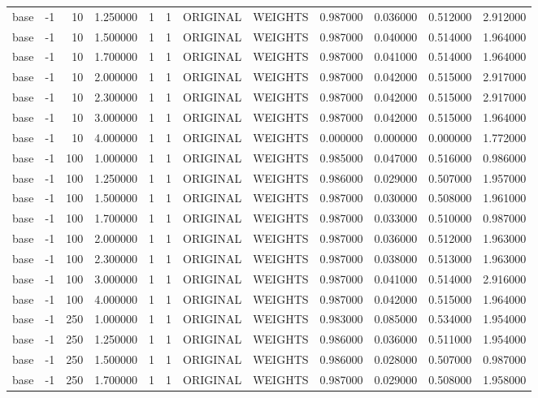 \begin{tabular}{lrrrllllrrrr}
base & -1 & 10 & 1.250000 & 1 & 1 & ORIGINAL & WEIGHTS & 0.987000 & 0.036000 & 0.512000 & 2.912000 \\
base & -1 & 10 & 1.500000 & 1 & 1 & ORIGINAL & WEIGHTS & 0.987000 & 0.040000 & 0.514000 & 1.964000 \\
base & -1 & 10 & 1.700000 & 1 & 1 & ORIGINAL & WEIGHTS & 0.987000 & 0.041000 & 0.514000 & 1.964000 \\
base & -1 & 10 & 2.000000 & 1 & 1 & ORIGINAL & WEIGHTS & 0.987000 & 0.042000 & 0.515000 & 2.917000 \\
base & -1 & 10 & 2.300000 & 1 & 1 & ORIGINAL & WEIGHTS & 0.987000 & 0.042000 & 0.515000 & 2.917000 \\
base & -1 & 10 & 3.000000 & 1 & 1 & ORIGINAL & WEIGHTS & 0.987000 & 0.042000 & 0.515000 & 1.964000 \\
base & -1 & 10 & 4.000000 & 1 & 1 & ORIGINAL & WEIGHTS & 0.000000 & 0.000000 & 0.000000 & 1.772000 \\
base & -1 & 100 & 1.000000 & 1 & 1 & ORIGINAL & WEIGHTS & 0.985000 & 0.047000 & 0.516000 & 0.986000 \\
base & -1 & 100 & 1.250000 & 1 & 1 & ORIGINAL & WEIGHTS & 0.986000 & 0.029000 & 0.507000 & 1.957000 \\
base & -1 & 100 & 1.500000 & 1 & 1 & ORIGINAL & WEIGHTS & 0.987000 & 0.030000 & 0.508000 & 1.961000 \\
base & -1 & 100 & 1.700000 & 1 & 1 & ORIGINAL & WEIGHTS & 0.987000 & 0.033000 & 0.510000 & 0.987000 \\
base & -1 & 100 & 2.000000 & 1 & 1 & ORIGINAL & WEIGHTS & 0.987000 & 0.036000 & 0.512000 & 1.963000 \\
base & -1 & 100 & 2.300000 & 1 & 1 & ORIGINAL & WEIGHTS & 0.987000 & 0.038000 & 0.513000 & 1.963000 \\
base & -1 & 100 & 3.000000 & 1 & 1 & ORIGINAL & WEIGHTS & 0.987000 & 0.041000 & 0.514000 & 2.916000 \\
base & -1 & 100 & 4.000000 & 1 & 1 & ORIGINAL & WEIGHTS & 0.987000 & 0.042000 & 0.515000 & 1.964000 \\
base & -1 & 250 & 1.000000 & 1 & 1 & ORIGINAL & WEIGHTS & 0.983000 & 0.085000 & 0.534000 & 1.954000 \\
base & -1 & 250 & 1.250000 & 1 & 1 & ORIGINAL & WEIGHTS & 0.986000 & 0.036000 & 0.511000 & 1.954000 \\
base & -1 & 250 & 1.500000 & 1 & 1 & ORIGINAL & WEIGHTS & 0.986000 & 0.028000 & 0.507000 & 0.987000 \\
base & -1 & 250 & 1.700000 & 1 & 1 & ORIGINAL & WEIGHTS & 0.987000 & 0.029000 & 0.508000 & 1.958000 \\

\end{tabular}

